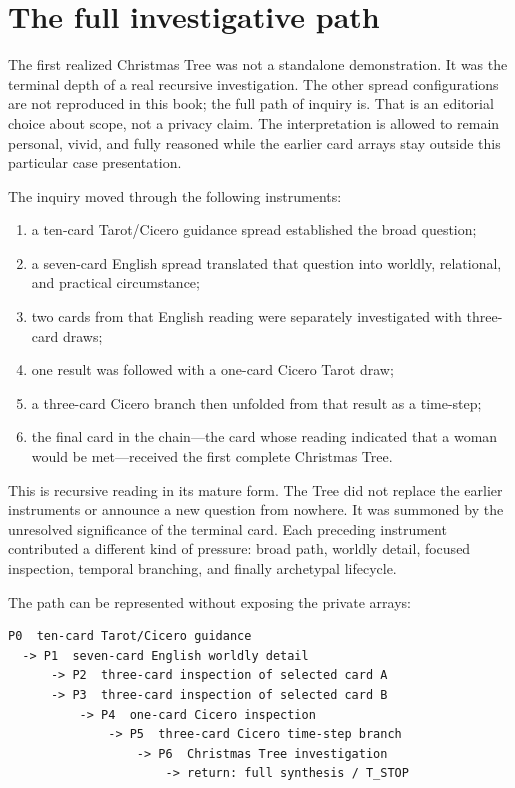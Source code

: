 \section{The full investigative path}

The first realized Christmas Tree was not a standalone demonstration. It was
the terminal depth of a real recursive investigation. The other spread
configurations are not reproduced in this book; the full path of inquiry is.
That is an editorial choice about scope, not a privacy claim. The interpretation
is allowed to remain personal, vivid, and fully reasoned while the earlier card
arrays stay outside this particular case presentation.

The inquiry moved through the following instruments:

\begin{enumerate}
\item a ten-card Tarot/Cicero guidance spread established the broad question;
\item a seven-card English spread translated that question into worldly,
      relational, and practical circumstance;
\item two cards from that English reading were separately investigated with
      three-card draws;
\item one result was followed with a one-card Cicero Tarot draw;
\item a three-card Cicero branch then unfolded from that result as a time-step;
\item the final card in the chain—the card whose reading indicated that a
      woman would be met—received the first complete Christmas Tree.
\end{enumerate}

This is recursive reading in its mature form. The Tree did not replace the
earlier instruments or announce a new question from nowhere. It was summoned by
the unresolved significance of the terminal card. Each preceding instrument
contributed a different kind of pressure: broad path, worldly detail, focused
inspection, temporal branching, and finally archetypal lifecycle.

The path can be represented without exposing the private arrays:

\begin{verbatim}
P0  ten-card Tarot/Cicero guidance
  -> P1  seven-card English worldly detail
      -> P2  three-card inspection of selected card A
      -> P3  three-card inspection of selected card B
          -> P4  one-card Cicero inspection
              -> P5  three-card Cicero time-step branch
                  -> P6  Christmas Tree investigation
                      -> return: full synthesis / T_STOP
\end{verbatim}

